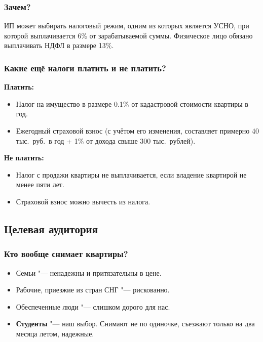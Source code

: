 \documentclass{beamer}
\begin{document}
		\begin{frame}
			\frametitle{Зачем?}
		
			ИП может выбирать налоговый режим, одним из которых является УСНО, при которой выплачивается 6\% от зарабатываемой суммы.
			Физическое лицо обязано выплачивать НДФЛ в размере 13\%.
		
		\end{frame}

		\begin{frame}
			\frametitle{Какие ещё налоги платить и не платить?}
			
			\textbf{Платить:}
			\begin{itemize}
			
			\item Налог на имущество в размере 0.1\% от кадастровой стоимости квартиры в год.
			
			\item Ежегодный страховой взнос (с учётом его изменения, составляет примерно 40 тыс.\ руб.\ в год + 1\% от дохода свыше 300 тыс.\ рублей).
			
			\end{itemize}
		
			\textbf{Не платить:}
			\begin{itemize}
			
			\item Налог с продажи квартиры не выплачивается, если владение квартирой не менее пяти лет.
			
			\item Страховой взнос можно вычесть из налога.
			
			\end{itemize}
					
		\end{frame}
		
	\subsection{Целевая аудитория}
	
		\begin{frame}
			\frametitle{Кто вообще снимает квартиры?}
			
				\begin{itemize}
					\item Семьи "--- ненадежны и притязательны в цене.
					\item Рабочие, приезжие из стран СНГ "--- рискованно.
					\item Обеспеченные люди "--- слишком дорого для нас.
					\item \textbf{Студенты} "--- наш выбор.
							Снимают не по одиночке, съезжают только на два месяца летом, надежные.
				\end{itemize}
			
		\end{frame}
		
\end{document}
